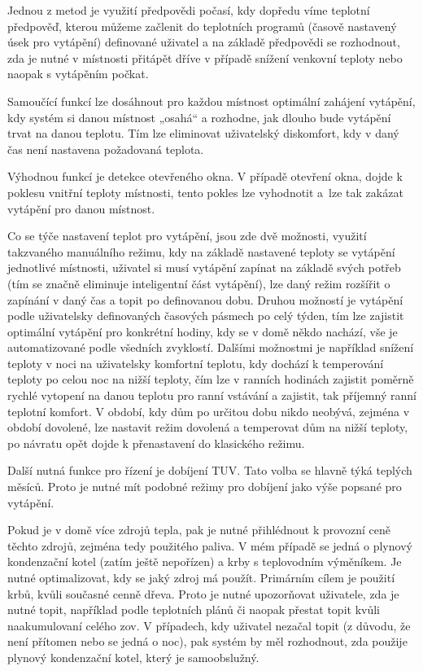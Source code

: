 Jednou z metod je využití předpovědi počasí, kdy dopředu víme teplotní předpověď, kterou můžeme začlenit do teplotních programů (časově nastavený úsek pro vytápění) definované uživatel a na základě  předpovědi se rozhodnout, zda je nutné v místnosti přitápět dříve v případě snížení venkovní teploty nebo naopak s vytápěním počkat. 

Samoučící funkcí lze dosáhnout pro každou místnost optimální zahájení vytápění, kdy systém si danou místnost „osahá“ a rozhodne, jak dlouho bude vytápění trvat na danou teplotu. Tím lze eliminovat uživatelský diskomfort, kdy v daný čas není nastavena požadovaná teplota.

Výhodnou funkcí je detekce otevřeného okna. V případě otevření okna, dojde k poklesu vnitřní teploty místnosti, tento pokles lze vyhodnotit a~lze tak zakázat vytápění pro danou místnost.

Co se týče nastavení teplot pro vytápění, jsou zde dvě možnosti, využití takzvaného manuálního režimu, kdy na základě nastavené teploty se vytápění jednotlivé místnosti, uživatel si musí vytápění zapínat na základě svých potřeb (tím se značně eliminuje inteligentní část vytápění), lze daný režim rozšířit o zapínání  v daný čas a topit po definovanou dobu. Druhou možností je vytápění podle uživatelsky definovaných časových pásmech po celý týden, tím lze zajistit optimální vytápění pro konkrétní hodiny, kdy se v domě někdo nachází, vše je automatizované podle všedních zvyklostí. Dalšími možnostmi je například snížení teploty v noci na uživatelsky komfortní teplotu, kdy dochází k temperování teploty po celou noc na nižší teploty, čím lze v ranních hodinách  zajistit poměrně rychlé vytopení na danou teplotu pro ranní vstávání a zajistit, tak příjemný ranní teplotní komfort. V období, kdy dům po určitou dobu nikdo neobývá, zejména v období dovolené, lze nastavit režim dovolená a temperovat dům na nižší teploty, po návratu opět dojde k přenastavení do klasického režimu. 

Další nutná funkce pro řízení je dobíjení TUV. Tato volba se hlavně týká teplých měsíců. Proto je nutné mít podobné režimy pro dobíjení jako výše popsané pro vytápění.

Pokud je v domě více zdrojů tepla, pak je nutné přihlédnout k provozní ceně těchto zdrojů, zejména tedy použitého paliva. V mém případě se jedná o plynový kondenzační kotel (zatím ještě nepořízen) a krby s teplovodním výměníkem. Je nutné optimalizovat, kdy se jaký zdroj má použít. Primárním cílem je použití krbů, kvůli současné cenně dřeva. Proto je nutné upozorňovat uživatele, zda je nutné topit, například podle teplotních plánů či naopak přestat topit kvůli naakumulovaní celého \acrshort{zov}. V případech, kdy uživatel nezačal topit (z důvodu, že není přítomen nebo se jedná o noc), pak systém by měl rozhodnout, zda použije plynový kondenzační kotel, který je samoobslužný.

